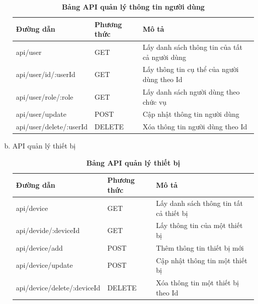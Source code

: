 \begin{enumerate}[a)]
  \begin{xltabular}{\textwidth}{
    | >{\raggedright\arraybackslash}p{4cm}
    | >{\centering\arraybackslash}m{2.8cm}
    | >{\raggedright\arraybackslash}X |
    }
    \caption{\bfseries \fontsize{12pt}{0pt}\selectfont Bảng API quản lý thông tin người dùng}
    \label{table_api_user}
    \\
    \hline
    \bfseries Đường dẫn    &\bfseries Phương thức    &\bfseries Mô tả\\ \hline
    api/user   &   GET  &  Lấy danh sách thông tin của tất cả người dùng \\  \hline
   api/user/id/:userId  &   GET     & Lấy thông tin cụ thể của người dùng theo Id \\ \hline
   api/user/role/:role  &   GET     & Lấy danh sách người dùng theo chức vụ \\ \hline
   api/user/update   &    POST    &  Cập nhật thông tin người dùng \\  \hline
   api/user/delete/:userId  &   DELETE     & Xóa thông tin người dùng theo Id \\ \hline
  \end{xltabular}

\item API quản lý thiết bị
\begin{xltabular}{\textwidth}{
  | >{\raggedright\arraybackslash}p{4.8cm}
  | >{\centering\arraybackslash}m{2.8cm}
  | >{\raggedright\arraybackslash}X |
  }
  \caption{\bfseries \fontsize{12pt}{0pt}\selectfont Bảng API quản lý thiết bị}
  \label{table_api_device}
  \\
  \hline
  \bfseries Đường dẫn    &\bfseries Phương thức    &\bfseries Mô tả\\ \hline
  api/device   &   GET  & Lấy danh sách thông tin tất cả thiết bị \\ \hline
  api/devide/:deviceId   &    GET    & Lấy thông tin của một thiết bị \\ \hline
  api/device/add &   POST     & Thêm thông tin thiết bị mới \\ \hline
  api/device/update  &     POST   & Cập nhật thông tin một thiết bị \\ \hline
  api/device/delete/:deviceId  &     DELETE   & Xóa thông tin một thiết bị theo Id \\ \hline
\end{xltabular}


\end{enumerate}

